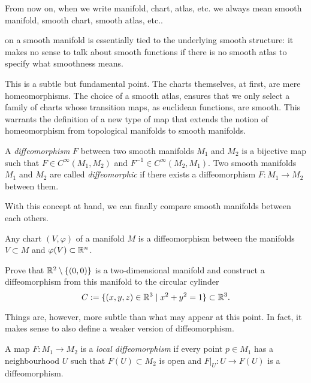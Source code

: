 \begin{tcolorbox}
  From now on, when we write manifold, chart, atlas, etc. we always mean smooth manifold, smooth chart, smooth atlas, etc..
\end{tcolorbox}

 on a smooth manifold is essentially tied to the underlying smooth structure: it makes no sense to talk about smooth functions if there is no smooth atlas to specify what smoothness means.

This is a subtle but fundamental point. The charts themselves, at first, are mere homeomorphisms.
The choice of a smooth atlas, ensures that we only select a family of charts whose transition maps, as euclidean functions, are smooth.
This warrants the definition of a new type of map that extends the notion of homeomorphism from topological manifolds to smooth manifolds.

\begin{definition}
  A \emph{diffeomorphism} $F$ between two smooth manifolds $M_1$ and $M_2$ is a bijective map such that $F\in C^\infty(M_1, M_2)$ and $F^{-1}\in C^\infty(M_2, M_1)$.
  Two smooth manifolds $M_1$ and $M_2$ are called \emph{diffeomorphic} if there exists a diffeomorphism $F:M_1\to M_2$ between them.
\end{definition}

With this concept at hand, we can finally compare smooth manifolds between each others.

\begin{exercise}\label{exe:charts-diffeo}
  Any chart $(V, \varphi)$ of a manifold $M$ is a diffeomorphism between the manifolds $V\subset M$ and $\varphi(V)\subset\mathbb{R}^n$.
\end{exercise}

\begin{exercise}
  Prove that $\mathbb{R}^2\setminus\{(0,0)\}$ is a two-dimensional manifold and construct a diffeomorphism from this manifold to the circular cylinder
  \begin{equation}
    C := \{ (x,y,z)\in\mathbb{R}^3 \mid x^2+y^2 = 1\}\subset\mathbb{R}^3.
  \end{equation}
\end{exercise}

Things are, however, more subtle than what may appear at this point.
In fact, it makes sense to also define a weaker version of diffeomorphism.

\begin{definition}
  A map $F : M_1 \to M_2$ is a \emph{local diffeomorphism} if every point $p\in M_1$ has a neighbourhood $U$ such that $F(U)\subset M_2$ is open and $F|_{U} : U \to F(U)$ is a diffeomorphism.
\end{definition}


